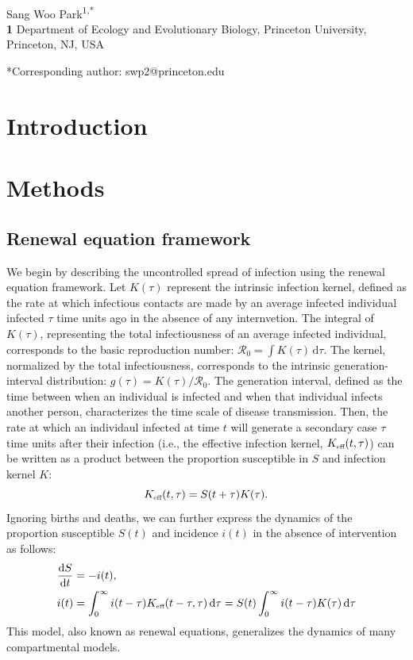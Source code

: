 \documentclass[12pt]{article}
\date{\today}
\newcommand{\Rx}[1]{\ensuremath{{\mathcal R}_{#1}}\xspace}
\newcommand{\Ro}{\Rx{0}}
\newcommand{\tsub}[2]{#1_{{\textrm{\tiny #2}}}}
\newcommand{\dd}[1]{\ensuremath{\, \mathrm{d}#1}}
\newcommand{\dtau}{\dd{\tau}}
\newcommand{\Keff}{\ensuremath{\tsub{K}{eff}}\xspace}
\begin{document}
\begin{flushleft}{
	\Large
	\textbf{}
}
\newline
\\
Sang Woo Park\textsuperscript{1,*}
\\
\bigskip
\textbf{1} Department of Ecology and Evolutionary Biology, Princeton University, Princeton, NJ, USA
\\
\bigskip

*Corresponding author: swp2@princeton.edu
\end{flushleft}


\section{Introduction}

\section{Methods}

\subsection{Renewal equation framework}

We begin by describing the uncontrolled spread of infection using the renewal equation framework.
Let $K(\tau)$ represent the intrinsic infection kernel, defined as the rate at which infectious contacts are made by an average infected individual infected $\tau$ time units ago in the absence of any internvetion.
The integral of $K(\tau)$, representing the total infectiousness of an average infected individual, corresponds to the basic reproduction number: $\Ro = \int K(\tau) \dtau$.
The kernel, normalized by the total infectiousness, corresponds to the intrinsic generation-interval distribution: $g(\tau) = K(\tau)/\Ro$.
The generation interval, defined as the time between when an individual is infected and when that individual infects another person, characterizes the time scale of disease transmission.
Then, the rate at which an individaul infected at time $t$ will generate a secondary case $\tau$ time units after their infection (i.e., the effective infection kernel, $\Keff(t,\tau)$) can be written as a product between the proportion susceptible in $S$ and infection kernel $K$:
\begin{equation}
\Keff(t,\tau) = S(t+\tau) K(\tau).
\end{equation}
Ignoring births and deaths, we can further express the dynamics of the proportion susceptible $S(t)$ and incidence $i(t)$ in the absence of intervention as follows:
\begin{align}
\frac{\mathrm{d}S}{\mathrm{d}t} &= - i(t),\\
i(t) &= \int_0^\infty i(t-\tau) \Keff(t-\tau, \tau) \dtau = S(t) \int_0^\infty i(t-\tau) K(\tau) \dtau
\end{align}
This model, also known as renewal equations, generalizes the dynamics of many compartmental models.
\end{document}
